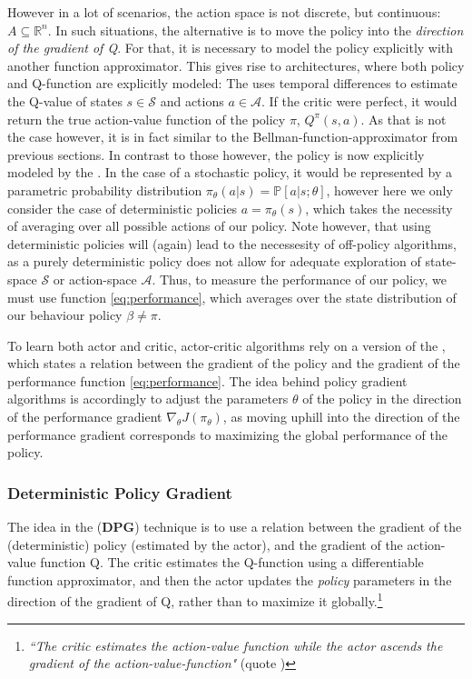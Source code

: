\noindent However in a lot of scenarios, the action space is not discrete, but continuous: \mbox{$A \subseteq \mathds{R}^n$}. In such situations, the alternative is to move the policy into the \textit{direction of the gradient of Q}. For that, it is necessary to model the policy explicitly with another function approximator. This gives rise to  architectures, where both policy and Q-function are explicitly modeled: The  uses temporal differences to estimate the Q-value of states $s \in \mathcal{S}$ and actions $a \in \mathcal{A}$. If the critic were perfect, it would return the true action-value function of the policy $\pi$, $Q^\pi(s,a)$. As that is not the case however, it is in fact similar to the Bellman-function-approximator from previous sections. In contrast to those however, the policy is now explicitly modeled by the . In the case of a stochastic policy, it would be represented by a parametric probability distribution $\pi_\theta(a|s) = \mathds{P}[a|s;\theta]$, however here we only consider the case of deterministic policies $a = \pi_\theta(s)$, which takes the necessity of averaging over all possible actions of our policy. Note however, that using deterministic policies will (again) lead to the necessesity of off-policy algorithms, as a purely deterministic policy does not allow for adequate exploration of state-space $\mathcal{S}$ or action-space $\mathcal{A}$. Thus, to measure the performance of our policy, we must use function \ref{eq:performance}, which averages over the state distribution of our behaviour policy $\beta \neq \pi$. 

To learn both actor and critic, actor-critic algorithms rely on a version of the , which states a relation between the gradient of the policy and the gradient of the performance function \ref{eq:performance}. The idea behind policy gradient algorithms is accordingly to adjust the parameters $\theta$ of the policy in the direction of the performance gradient $\nabla_{\theta}J(\pi_\theta)$, as moving uphill into the direction of the performance gradient corresponds to maximizing the global performance of the policy.

\subsubsection{Deterministic Policy Gradient}

The idea in the  (\textbf{DPG}) technique is to use a relation between the gradient of the (deterministic) policy (estimated by the actor), and the gradient of the action-value function Q. The critic estimates the Q-function using a differentiable function approximator, and then the actor updates the \textit{policy} parameters in the direction of the gradient of Q, rather than to maximize it globally.\footnote{\textit{``The critic estimates the action-value function while the actor ascends the gradient of the action-value-function"} (quote \cite{silver_deterministic_2014})}\\

